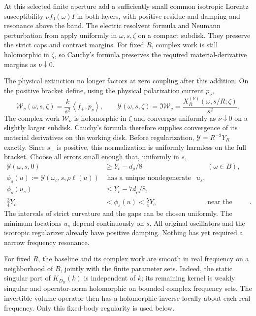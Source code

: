 \documentclass[11pt]{article}
\newcommand{\ip}[2]{\left\langle#1,#2\right\rangle}
\begin{document}
At this selected finite aperture add a sufficiently small common isotropic
Lorentz susceptibility $\nu f_0(\omega)I$ in both layers, with positive
residue and damping and resonance above the band.
The electric resolvent formula and Neumann perturbation from \cite{strict}
apply uniformly in $\omega,s,\zeta$ on a compact subdisk. They preserve the
strict caps and contrast margins. For fixed $R$, complex work is still
holomorphic in $\zeta$, so Cauchy's formula preserves the required
material-derivative margins as $\nu\downarrow0$.

The physical extinction no longer factors at zero coupling after this
addition. On the positive bracket define, using the physical polarization
current $p_\nu$,
\begin{equation}\label{eq:finite-F}
 \mathcal W_\nu(\omega,s,\zeta)=\frac{k}{s^2}\ip{f_+}{p_\nu},
 \qquad
 \mathcal Y(\omega,s,\zeta)=\Im\mathcal W_\nu
 =\frac{X^{(\nu)}_R(\omega,s/R;\zeta)}{s^2}.
\end{equation}
The complex work $\mathcal W_\nu$ is holomorphic in $\zeta$ and converges
uniformly as $\nu\downarrow0$ on a slightly larger subdisk. Cauchy's formula
therefore supplies convergence of its material derivatives on the working
disk. Before regularization, $\mathcal Y=R^{-2}Y_R$ exactly. Since $s_-$ is
positive, this normalization is uniformly harmless on the full bracket.
Choose all errors small enough that, uniformly in $s$,
\begin{align}
 \mathcal Y(\omega,s,0)&\ge Y_c-d_\rho/8
       &&(\omega\in B),\label{eq:baseline-gap}\\
 \phi_s(u):=\mathcal Y(\omega_c,s,\rho\ell(u))
 &\text{ has a unique nondegenerate minimum }u_s,\nonumber\\
 \phi_s(u_s)&\le Y_c-7d_\rho/8,\label{eq:dip-gap}\\
 \tfrac34Y_c&<\phi_s(u)<\tfrac54Y_c
       &&\text{near the minima}.\label{eq:value-bracket}
\end{align}
The intervals of strict curvature and the gaps can be chosen uniformly.
The minimum locations $u_s$ depend continuously on $s$.
All original oscillators and the isotropic regularizer already have positive
damping. Nothing has yet required a narrow frequency resonance.

For fixed $R$, the baseline and its complex work are smooth in real frequency
on a neighborhood of $B$, jointly with the finite parameter sets.
Indeed, the static singular part of $K_{D_R}(k)$ is independent of $k$;
its remaining kernel is weakly singular and operator-norm holomorphic on
bounded complex frequency sets. The invertible volume operator then has a
holomorphic inverse locally about each real frequency.
Only this fixed-body regularity is used below.
\end{document}
